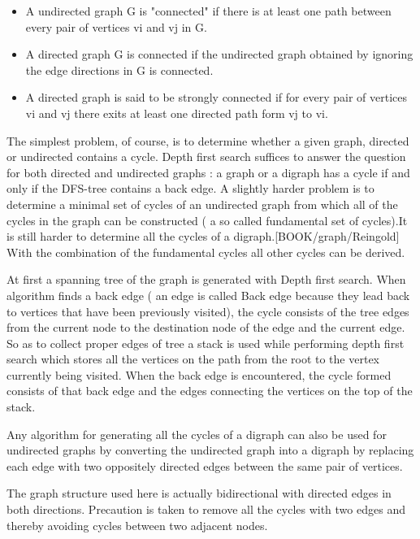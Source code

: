 	\begin{itemize}

	\item
    A undirected graph G is "connected" if there is at least one
    path between every pair of vertices vi and vj in G.
	\item
    A directed graph G is connected if the undirected graph obtained by
    ignoring the edge directions in G is connected.
	\item
    A directed graph is said to be strongly connected if for every pair of
    vertices vi and vj there exits at least one directed path form vj to vi.

	\end{itemize}

	The simplest problem, of course, is to determine whether a given graph,
	directed or undirected contains a cycle. Depth first search suffices
	to answer the question for both directed and undirected graphs : a graph
	or a digraph has a cycle if and only if the DFS-tree contains a back edge.	
	A slightly harder problem is to determine a minimal set of cycles of an
	undirected graph from which all of the cycles in the graph can be 
	constructed ( a so called fundamental set of cycles).It is still harder
	to determine all the cycles of a digraph.[BOOK/graph/Reingold] With the
	combination of the fundamental cycles all other cycles can be derived.


		At first a spanning tree of the graph is generated with Depth first
	search. When algorithm finds a back edge ( an edge is called Back edge
	because they lead back to vertices that have been previously visited),
	the cycle consists of the tree edges from the current node to the
	destination node of the edge and the current edge. So as to collect proper
	edges of tree a stack is used while performing depth first search which
	stores all the vertices on the path from the root to the vertex currently
	being visited. When the back edge is encountered, the cycle formed
	consists of that back edge and the edges connecting the vertices on the
	top of the stack.


		Any algorithm for generating all the cycles of a
	digraph can also be used for undirected graphs by converting the undirected
	graph into a digraph by replacing each edge with two oppositely directed
	edges between the same pair of vertices.~\cite{Rein}


		The graph structure used here is actually bidirectional with directed
	edges in both directions. Precaution is taken to remove all the cycles with
	two edges and  thereby avoiding cycles between two adjacent nodes.


